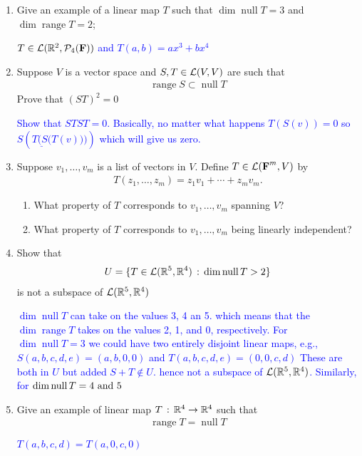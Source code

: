 \documentclass[10pt,a4paper]{report}
\DeclareMathOperator{\RANGE}{range}
\DeclareMathOperator{\NULL}{null}
\newcommand{\BLUE}[1]{\textcolor{blue}{#1}}
\newcommand{\F}{\textbf{F}}
\begin{document}
\begin{enumerate}

\item Give an example of a linear map $T$ such that $\dim\NULL T = 3$ and $\dim \RANGE T=2$;

\BLUE{$T \in \LL(\R^2,\mathcal{P}_4(\F))$ and $T(a,b)=ax^3+bx^4$
}

\item Suppose $V$ is a vector space and $S,T \in \mathcal{L}(V,V)$ are such that 
\begin{align*}
	\RANGE S \subset \NULL T
\end{align*}Prove that $(ST)^2=0$

\BLUE{Show that $STST=0$.  Basically, no matter what happens $T(S(v))=0$ so $S(\underline{T(S(}T(v)\textbf{))})$ which will give us zero.
}

\item Suppose $v_1, \dots, v_m$ is a list of vectors in $V$.  Define $T \in \LL(\F^m,V)$ by 
\begin{align*}
	T(z_1,\dots,z_m)=z_1v_1+\cdots+z_mv_m.
\end{align*}\begin{enumerate}
\item What property of $T$ corresponds to $v_1,\dots,v_m$ spanning $V$?
\item What property of $T$ corresponds to $v_1,\dots,v_m$ being linearly independent?
\end{enumerate}

\item Show that 
\begin{align*}
	U=\{T \in\LL(\R^5,\R^4)\,:\,\dim\NULL T > 2\}
\end{align*}is not a subspace of $\mathcal{L}(\mathbb{R}^5,\mathbb{R}^4)$

\BLUE{$\dim \NULL T$ can take on the values 3, 4 an 5.  which means that the $\dim \RANGE T$ takes on the values 2, 1, and 0, respectively.  For $\dim \NULL T =3 $ we could have two entirely disjoint linear maps, e.g., $S(a,b,c,d,e) = (a,b, 0,0)$ and $T(a,b,c,d,e)=(0,0,c,d)$ These are both in $U$ but added $S+T \not \in U$. hence not a subspace of $\mathcal{L}(\mathbb{R}^5,\mathbb{R}^4)$.  Similarly, for $\dim \NULL T = 4 \AND 5$
}

\item Give an example of linear map $T\,:\,\mathbb{R}^4\to\mathbb{R}^4$ such that 
\begin{align*}
	\RANGE T = \NULL T
\end{align*}

\BLUE{$T(a,b,c,d)=T(a,0,c,0)$}


\end{enumerate}
\end{document}
